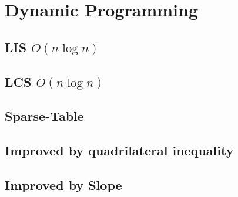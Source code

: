 \section{Dynamic Programming}
\subsection{LIS $O(n\log{n})$}

\subsection{LCS $O(n\log{n})$}

\subsection{Sparse-Table}

\subsection{Improved by quadrilateral inequality}

\subsection{Improved by Slope}

